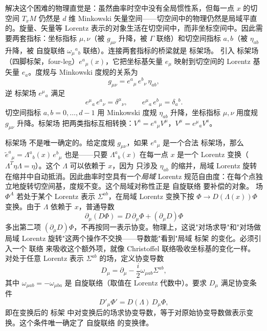解决这个困难的物理直觉是：虽然曲率时空中没有全局惯性系，但每一点 $x$ 的切空间 $T_xM$ 仍然是 $d$ 维 Minkowski 矢量空间——切空间中的物理仍然是局域平直的。旋量、矢量等 Lorentz 表示的对象生活在切空间中，而非坐标空间中。因此需要两套指标：坐标指标 $\mu,\nu$（被 $g_{\mu\nu}$ 升降，被 $\Gamma$ 联络）和切空间指标 $a,b$（被 $\eta_{ab}$ 升降，被 自旋联络 $\omega_\mu{}^a{}_b$ 联络）。连接两套指标的桥梁就是 标架场。
引入 标架场（四脚标架，four-leg）$e^a{}_\mu(x)$，它把坐标基矢量 $e_\mu$ 映射到切空间的 Lorentz 基矢量 $e_a$。度规与 Minkowski 度规的关系为
\begin{equation}\label{eq:ms-curved-vielbein}
\boxed{g_{\mu\nu}=e^a{}_\mu\,e^b{}_\nu\,\eta_{ab},}
\end{equation}
逆 标架场 $e^\mu{}_a$ 满足
\begin{equation}
e^\mu{}_a\,e^a{}_\nu=\delta^\mu{}_\nu,\qquad e^\mu{}_a\,e^b{}_\mu=\delta_a{}^b.
\end{equation}
切空间指标 $a,b=0,\ldots,d-1$ 用 Minkowski 度规 $\eta_{ab}$ 升降，坐标指标 $\mu,\nu$ 用度规 $g_{\mu\nu}$ 升降。标架场 把两类指标互相转换：$V^a=e^a{}_\mu V^\mu$，$V^\mu=e^\mu{}_a V^a$。

标架场 不是唯一确定的。给定度规 $g_{\mu\nu}$，如果 $e^a{}_\mu$ 是一个合法 标架场，那么 $\tilde e^a{}_\mu=\Lambda^a{}_b(x)\,e^b{}_\mu$ 也是——只要 $\Lambda^a{}_b(x)$ 在每一点 $x$ 是一个 Lorentz 变换（$\Lambda^T\eta\Lambda=\eta$）。这个 $\Lambda$ 可以依赖于 $x$，因为 只涉及 $\eta_{ab}$ 的缩并，局域 Lorentz 旋转在缩并中自动抵消。因此曲率时空具有一个\emph{局域} Lorentz 规范自由度：在每个点独立地旋转切空间基，度规不变。这个局域对称性正是 自旋联络 要补偿的对象。
场 $\Phi^A$ 若处于某个 Lorentz 表示 $\Sigma^{ab}$，在局域 Lorentz 变换下按 $\Phi\to D(\Lambda(x))\Phi$ 变换。由于 $\Lambda$ 依赖于 $x$，普通导数
\begin{equation*}
\partial_\mu(D\Phi)=D\,\partial_\mu\Phi+(\partial_\mu D)\Phi
\end{equation*}
多出第二项 $(\partial_\mu D)\Phi$，不再按同一表示协变。物理上，这说"对场求导"和"对场做局域 Lorentz 旋转"这两个操作不交换——导数能"看到"局域 标架 的变化。必须引入一个 联络 来吸收这个额外项，就像 Christoffel 联络吸收坐标基的变化一样。
对处于任意 Lorentz 表示 $\Sigma^{ab}$ 的场，定义协变导数
\begin{equation}\label{eq:ms-curved-Dmu}
\boxed{
D_\mu=\partial_\mu-\frac{i}{2}\omega_{\mu ab}\Sigma^{ab},
}
\end{equation}
其中 $\omega_{\mu ab}=-\omega_{\mu ba}$ 是 自旋联络（取值在 Lorentz 代数中）。要求 $D_\mu$ 满足协变条件
\begin{equation}\label{eq:ms-curved-D-cov}
D'_\mu\Phi'=D(\Lambda)\,D_\mu\Phi,
\end{equation}
即在变换后的 标架 中对变换后的场求协变导数，等于对原始协变导数做表示变换。这个条件唯一确定了 自旋联络 的变换律。

